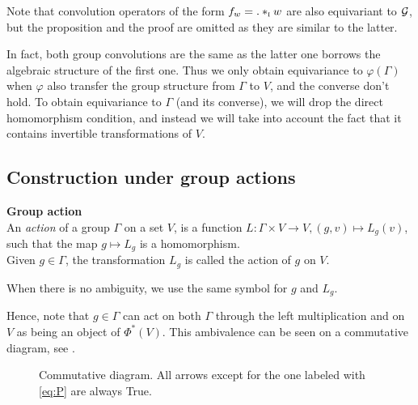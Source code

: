 \begin{remark}Note that convolution operators of the form $f_w = . \ast_{\operatorname{\textsc{i}}} w$ are also equivariant to $\mathcal{G}$, but the proposition and the proof are omitted as they are similar to the latter.
\end{remark}

In fact, both group convolutions are the same as the latter one borrows the algebraic structure of the first one. Thus we only obtain equivariance to $\varphi(\Gamma)$ when $\varphi$ also transfer the group structure from $\Gamma$ to $V$, and the converse don't hold. To obtain equivariance to $\Gamma$ (and its converse), we will drop the direct homomorphism condition, and instead we will take into account the fact that it contains invertible transformations of $V$.

\subsection{Construction under group actions}

\begin{definition}\textbf{Group action}\\
An \emph{action} of a group $\Gamma$ on a set $V$, is a function $L: \Gamma \times V \rightarrow V, (g,v) \mapsto L_g(v)$, such that the map $g \mapsto L_g$ is a homomorphism.\\
Given $g \in \Gamma$, the transformation $L_g$ is called the action of $g$ on $V$.
\end{definition}

\begin{remark}
When there is no ambiguity, we use the same symbol for $g$ and $L_g$. 
\end{remark}

Hence, note that $g \in \Gamma$ can act on both $\Gamma$ through the left multiplication and on $V$ as being an object of $\Phi^{*}(V)$. This ambivalence can be seen on a commutative diagram, see .%

\begin{figure}[H]
\centering
{}
\caption{Commutative diagram. All arrows except for the one labeled with \eqref{eq:P} are always True.}
\label{fig:com}
\end{figure}

